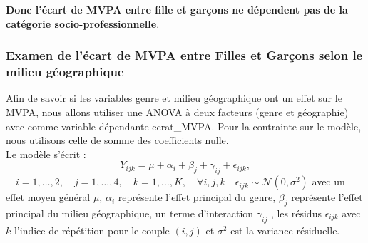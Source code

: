 \documentclass[12pt,a4paper]{article}
\begin{document}
	\textbf{Donc l'écart de MVPA entre fille et garçons ne dépendent pas de la catégorie socio-professionnelle}.
	
	\subsubsection{Examen de l'écart de MVPA entre Filles et Garçons selon le milieu géographique}
	Afin de savoir si les variables genre et milieu géographique ont un effet sur le MVPA, nous allons utiliser une ANOVA à deux facteurs (genre et géographie) avec comme variable dépendante ecrat\_MVPA. Pour la contrainte sur le modèle, nous utilisons celle de somme des coefficients nulle. \\
	Le modèle s'écrit : 
	\begin{equation}
		Y_{ijk} = \mu + \alpha_i + \beta_j + \gamma_{ij} + \epsilon_{ijk},
	\end{equation}
	$\quad i = 1, \ldots, 2, \quad j = 1, \ldots, 4, \quad k = 1, \ldots, K, \quad \forall i,j,k \quad \epsilon_{ijk} \sim \mathcal{N}(0,\sigma^2)$
	avec un effet moyen général $\mu$, $\alpha_i$ représente l'effet principal du genre, $\beta_j$ représente l'effet principal du milieu géographique, un terme d'interaction $\gamma_{ij}$ , les résidus $\epsilon_{ijk}$ avec $k$ l'indice de répétition pour le couple $(i,j)$ et $\sigma^2$ est la variance résiduelle.\\
	
\end{document}
